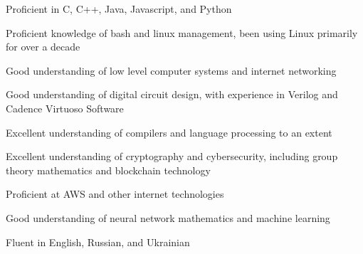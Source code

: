 

\begin{cvparagraph}

\;
    \begin{cvitems}
        \item Proficient in C, C++, Java, Javascript, and Python
        \item Proficient knowledge of bash and linux management, been using Linux primarily for over a decade
        \item Good understanding of low level computer systems and internet networking
        \item Good understanding of digital circuit design, with experience in Verilog and Cadence Virtuoso Software
        \item Excellent understanding of compilers and language processing to an extent
        \item Excellent understanding of cryptography and cybersecurity, including group theory mathematics and blockchain technology
        \item Proficient at AWS and other internet technologies
        \item Good understanding of neural network mathematics and machine learning
        \item Fluent in English, Russian, and Ukrainian
    \end{cvitems}
\end{cvparagraph}
